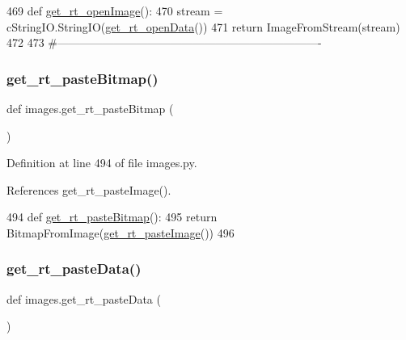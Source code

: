 \begin{DoxyCode}
469 \textcolor{keyword}{def }\hyperlink{namespaceimages_a82d1ce2172b3d643c512f8711182e732}{get\_rt\_openImage}():
470     stream = cStringIO.StringIO(\hyperlink{namespaceimages_addfd58d6ab4de5a4b3eca7b6f057d234}{get\_rt\_openData}())
471     \textcolor{keywordflow}{return} ImageFromStream(stream)
472 
473 \textcolor{comment}{#----------------------------------------------------------------------}
\end{DoxyCode}
\mbox{\label{namespaceimages_a4c113665b231ff3ffc57a7e599235225}} 
\subsubsection{\texorpdfstring{get\+\_\+rt\+\_\+paste\+Bitmap()}{get\_rt\_pasteBitmap()}}
{\footnotesize\ttfamily def images.\+get\+\_\+rt\+\_\+paste\+Bitmap (\begin{DoxyParamCaption}{ }\end{DoxyParamCaption})}



Definition at line 494 of file images.\+py.



References get\+\_\+rt\+\_\+paste\+Image().


\begin{DoxyCode}
494 \textcolor{keyword}{def }\hyperlink{namespaceimages_a4c113665b231ff3ffc57a7e599235225}{get\_rt\_pasteBitmap}():
495     \textcolor{keywordflow}{return} BitmapFromImage(\hyperlink{namespaceimages_aafce09d643eafa16868d813270beb9e3}{get\_rt\_pasteImage}())
496 
\end{DoxyCode}
\mbox{\label{namespaceimages_add410f080839e1241e8a9c07e2d46490}} 
\subsubsection{\texorpdfstring{get\+\_\+rt\+\_\+paste\+Data()}{get\_rt\_pasteData()}}
{\footnotesize\ttfamily def images.\+get\+\_\+rt\+\_\+paste\+Data (\begin{DoxyParamCaption}{ }\end{DoxyParamCaption})}



